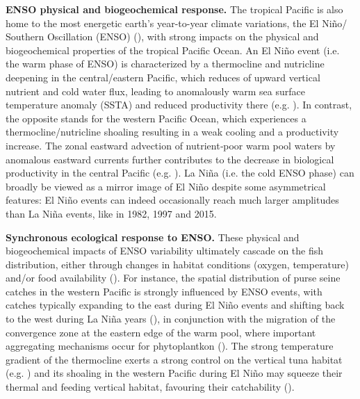 \textbf{ENSO physical and biogeochemical response.} The tropical Pacific is also home to the most energetic earth’s year-to-year climate variations, the El Niño/ Southern Oscillation (ENSO) (\cite{caiChangingNinoSouthern2021}), with strong impacts on the physical and biogeochemical properties of the tropical Pacific Ocean.  An El Niño event (i.e. the warm phase of ENSO) is characterized by a thermocline and nutricline deepening in the central/eastern Pacific, which reduces of upward vertical nutrient and cold water flux, leading to anomalously warm sea surface temperature anomaly (SSTA) and reduced productivity there  (e.g. \cite{chavezBiologicalChemicalResponse1999a, murtuguddeOceanColorVariability1999}). In contrast, the opposite stands for the western Pacific Ocean, which experiences a thermocline/nutricline shoaling resulting in a weak cooling and a productivity increase. The zonal eastward advection of nutrient‐poor warm pool waters by anomalous eastward currents further contributes to the decrease in biological productivity in the central Pacific (e.g. \cite{chavezBiologicalChemicalResponse1999a, picautOceanicZoneConvergence2001}). La Niña (i.e. the cold ENSO phase) can broadly be viewed as a mirror image of El Niño despite some asymmetrical features: El Niño events can indeed occasionally reach much larger amplitudes than La Niña events, like in 1982, 1997 and 2015.  

\textbf{Synchronous ecological response to ENSO.} These physical and biogeochemical impacts of ENSO variability ultimately cascade on the fish distribution, either through changes in habitat conditions (oxygen, temperature) and/or food availability (\cite{aNinoSouthernOscillation2020}). For instance, the spatial distribution of purse seine catches in the western Pacific is strongly influenced by ENSO events, with catches typically expanding to the east during El Niño events and shifting back to the west during La Niña years (\cite{lehodeyNinoSouthernOscillation1997}), in conjunction with the migration of the convergence zone at the eastern edge of the warm pool, where important aggregating mechanisms occur for phytoplantkon (\cite{picautOceanicZoneConvergence2001}). The strong temperature gradient of the thermocline exerts a strong control on the vertical tuna habitat (e.g. \cite{schaeferMovementsBehaviorHabitat2002}) and its shoaling in the western Pacific during El Niño may squeeze their thermal and feeding vertical habitat, favouring their catchability (\cite{bertrandHydrologicalTrophicCharacteristics2002}). 


